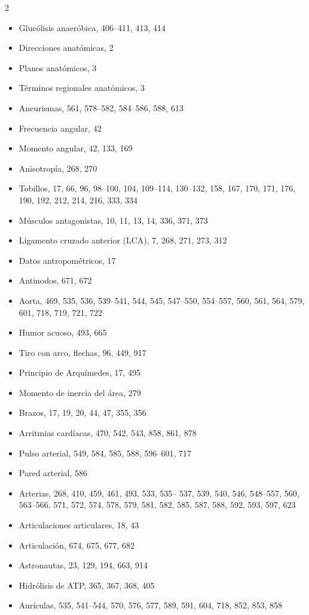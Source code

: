 \documentclass[12pt,a4paper]{book}
\begin{document}
\begin{multicols}{2}
\begin{itemize}[leftmargin=*]
  \item Glucólisis anaeróbica, 406--411, 413, 414
  \item Direcciones anatómicas, 2
  \item Planos anatómicos, 3
  \item Términos regionales anatómicos, 3
  \item Aneurismas, 561, 578--582, 584--586, 588, 613
  \item Frecuencia angular, 42
  \item Momento angular, 42, 133, 169
  \item Anisotropía, 268, 270
  \item Tobillos, 17, 66, 96, 98--100, 104, 109--114, 130--132, 158, 167, 170, 171, 176, 190, 192, 212, 214, 216, 333, 334
  \item Músculos antagonistas, 10, 11, 13, 14, 336, 371, 373
  \item Ligamento cruzado anterior (LCA), 7, 268, 271, 273, 312
  \item Datos antropométricos, 17
  \item Antinodos, 671, 672
  \item Aorta, 469, 535, 536, 539--541, 544, 545, 547--550, 554--557, 560, 561, 564, 579, 601, 718, 719, 721, 722
  \item Humor acuoso, 493, 665
  \item Tiro con arco, flechas, 96, 449, 917
  \item Principio de Arquímedes, 17, 495
  \item Momento de inercia del área, 279
  \item Brazos, 17, 19, 20, 44, 47, 355, 356
  \item Arritmias cardíacas, 470, 542, 543, 858, 861, 878
  \item Pulso arterial, 549, 584, 585, 588, 596--601, 717
  \item Pared arterial, 586
  \item Arterias, 268, 410, 459, 461, 493, 533, 535-- 537, 539, 540, 546, 548--557, 560, 563--566, 571, 572, 574, 578, 579, 581, 582, 585, 587, 588, 592, 593, 597, 623
  \item Articulaciones articulares, 18, 43
  \item Articulación, 674, 675, 677, 682
  \item Astronautas, 23, 129, 194, 663, 914
  \item Hidrólisis de ATP, 365, 367, 368, 405
  \item Aurículas, 535, 541--544, 570, 576, 577, 589, 591, 604, 718, 852, 853, 858

\end{itemize}
\end{multicols}
\end{document}
